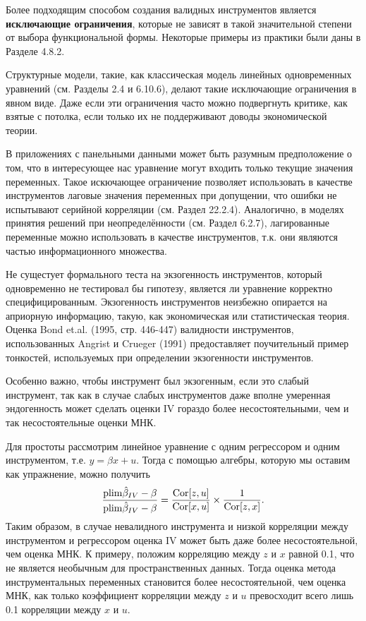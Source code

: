 Более подходящим способом создания валидных инструментов является \textbf{исключающие ограничения}, которые не зависят в такой значительной степени от выбора функциональной формы. Некоторые примеры из практики были даны в Разделе 4.8.2.

Структурные модели, такие, как классическая модель линейных одновременных уравнений (см. Разделы 2.4 и 6.10.6), делают такие исключающие ограничения в явном виде. Даже если эти ограничения часто можно подвергнуть критике, как взятые с потолка, если только их не поддерживают доводы экономической теории.

В приложениях с панельными данными может быть разумным предположение о том, что в интересующее нас уравнение могут входить только текущие значения переменных. Такое искючающее ограничение позволяет использовать в качестве инструментов лаговые значения переменных при допущении, что ошибки не испытывают серийной корреляции (см. Раздел 22.2.4). Аналогично, в моделях принятия решений при неопределённости (см. Раздел 6.2.7), лагированные переменные можно использовать в качестве инструментов, т.к. они являются частью информационного множества.

Не сущестует формального теста на экзогенность инструментов, который одновременно не тестировал бы гипотезу, является ли уравнение корректно специфицированным. Экзогенность инструментов неизбежно опирается на априорную информацию, такую, как экономическая или статистическая теория. Оценка Bond et.al. (1995, стр. 446-447) валидности инструментов, использованных Angrist и Crueger (1991) предоставляет поучительный пример тонкостей, используемых при определении экзогенности инструментов.

Особенно важно, чтобы инструмент был экзогенным, если это слабый инструмент, так как в случае слабых инструментов даже вполне умеренная эндогенность может сделать оценки IV гораздо более несостоятельными, чем и так несостоятельные оценки МНК.

Для простоты рассмотрим линейное уравнение с одним регрессором и одним инструментом, т.е. $y = \beta x +u$. Тогда с помощью алгебры, которую мы оставим как упражнение, можно получить 
\begin{equation}
\frac{\mathrm{plim } \hat{\beta}_{IV}-\beta}{\mathrm{plim } \hat{\beta}_{IV}-\beta}
=\frac{\mathrm{Cor}[z,u]}{\mathrm{Cor}[x,u]}\times \frac{1}{\mathrm{Cor}[z,x]}.
\end{equation}
Таким образом, в случае невалидного инструмента и низкой корреляции между инструментом и регрессором оценка IV может быть даже более несостоятельной, чем оценка МНК. К примеру, положим корреляцию между $z$ и $x$ равной 0.1, что не является необычным для пространственных данных. Тогда оценка метода инструментальных переменных становится более несостоятельной, чем оценка МНК, как только коэффициент корреляции между $z$ и $u$ превосходит всего лишь 0.1 корреляции между $x$ и $u$. 

